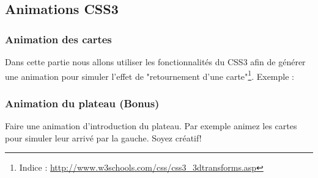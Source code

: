 \documentclass[a4paper,11pt]{article}
\theoremstyle{mytheor}
\begin{document}
\subsection{Animations CSS3}
\subsubsection{Animation des cartes}
Dans cette partie nous allons utiliser les fonctionnalités du CSS3 afin de générer une animation pour simuler l'effet de "retournement d'une carte"\footnote{Indice : \url{http://www.w3schools.com/css/css3_3dtransforms.asp}}. Exemple : \\




\subsubsection{Animation du plateau (Bonus)}
Faire une animation d'introduction du plateau. Par exemple animez les cartes pour simuler leur arrivé par la gauche. Soyez créatif! 
\end{document}
